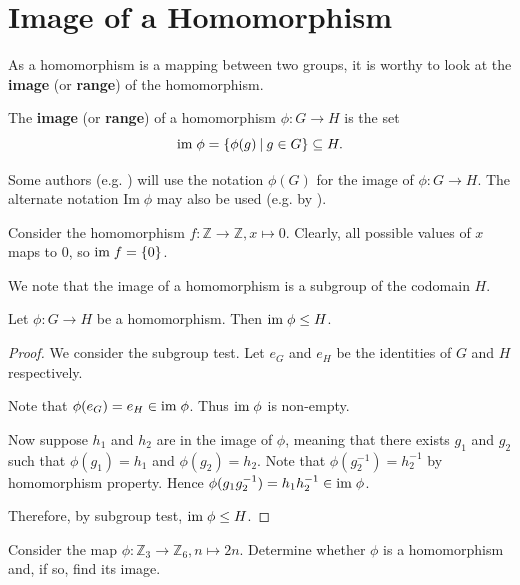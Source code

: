 \section{Image of a Homomorphism}
As a homomorphism is a mapping between two groups, it is worthy to look at the \textbf{image} (or \textbf{range}) of the homomorphism.
\begin{definition}
    The \textbf{image} (or \textbf{range}) of a homomorphism $\phi: G \to H$ is the set
    \[
        \im\phi = \{\phi(g) \vert g \in G\} \subseteq H.
    \]
\end{definition}
\begin{remark}
    Some authors (e.g. \cite{libretexts_imandker}) will use the notation $\phi(G)$ for the image of $\phi: G \to H$. The alternate notation $\mathrm{Im}\;\phi$ may also be used (e.g. by \cite{clark_1984, hungerford_1980}).
\end{remark}

\begin{example}
    Consider the homomorphism $f: \mathbb{Z} \to \mathbb{Z}, x \mapsto 0$. Clearly, all possible values of $x$ maps to 0, so $\mathrm{im}\; f = \{0\}$.
\end{example}

We note that the image of a homomorphism is a subgroup of the codomain $H$.
\begin{proposition}\label{prop-image-is-subgroup-of-codomain}
    Let $\phi: G \to H$ be a homomorphism. Then $\mathrm{im}\;\phi \leq H$.
\end{proposition}
\begin{proof}
    We consider the subgroup test. Let $e_G$ and $e_H$ be the identities of $G$ and $H$ respectively.
    
    Note that $\phi(e_G) = e_H \in \mathrm{im}\;\phi$. Thus $\mathrm{im}\;\phi$ is non-empty.
    
    Now suppose $h_1$ and $h_2$ are in the image of $\phi$, meaning that there exists $g_1$ and $g_2$ such that $\phi(g_1) = h_1$ and $\phi(g_2) = h_2$. Note that $\phi(g_2^{-1}) = h_2^{-1}$ by homomorphism property. Hence $\phi(g_1g_2^{-1}) = h_1h_2^{-1} \in \mathrm{im}\;\phi$.

    Therefore, by subgroup test, $\mathrm{im}\;\phi \leq H$.
\end{proof}

\begin{exercise}
    Consider the map $\phi: \mathbb{Z}_3 \to \mathbb{Z}_6, n \mapsto 2n$. Determine whether $\phi$ is a homomorphism and, if so, find its image.
\end{exercise}

